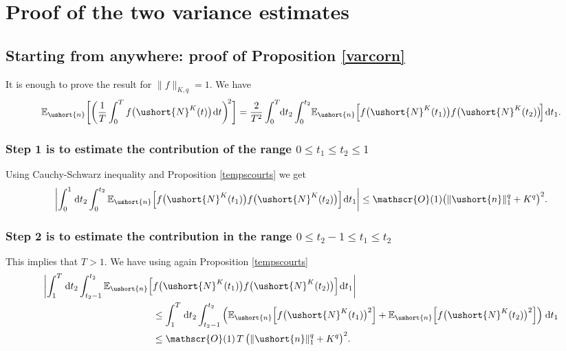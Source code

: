 \documentclass[10pt]{amsart}
\newcommand{\scaleto}[2]{#1}
\let\mathcal\mathscr
\numberwithin{equation}{section}
\theoremstyle{plain}
\theoremstyle{definition}
\newcommand{\E}{{\mathbb{E}}}
\newcommand{\Oun}{\mathcal{O}(1)}
\newcommand{\sK}{K}
\newcommand{\vecn}{\ushort{n}}
\newcommand{\leproc}{\ushort{N}^{K}}
\newcommand{\dd}{\hspace{1pt}\mathrm{d}}
\newcommand{\norm}[1]{\|#1\|_{1}}\let\snorm\norm
\begin{document}
\appendix

\section{Proof of the two variance estimates}\label{proof-variances}

\subsection{Starting from anywhere: proof of Proposition \ref{varcorn}}

It is enough to prove the result for $\|f\|_{\sK,q}=1$.
We have
\[
\E_{\vecn}\biggl[\biggl(\frac{1}{T}
\int_{0}^{T}f\bigl(\leproc(t)\bigr)\dd t\biggr)^{\!2}\biggr]
=\frac{\scaleto{2}{6pt}}{T^2}\int_{0}^{T}\!\!\dd t_{2}\int_{0}^{t_{2}}\!\E_{\vecn}\Bigl[
f\bigl(\leproc(t_{1})\bigr) f\bigl(\leproc(t_{2})\bigr)\!\Bigr]\dd t_{1}.
\]
\subsubsection*{Step 1 is to estimate the contribution of the range $0\le t_{1}\le t_{2}\le 1$} Using Cauchy-Schwarz inequality and Proposition \ref{tempscourts} we get
\[
\left|\int_{0}^{1}\dd t_{2}\int_{0}^{t_{2}}\E_{\vecn}\Bigl[
f\bigl(\leproc(t_{1})\bigr) f\bigl(\leproc(t_{2})\bigr)\Bigr]\dd t_{1}\right|
\le \Oun \bigl(\norm{\vecn}^{q}+K^{q}\bigr)^2.
\]
\subsubsection*{Step 2 is to estimate the contribution in the range $0\le
t_{2}-1\leq t_{1}\leq t_{2}$} This implies that $T>1$.
We have using again Proposition \ref{tempscourts}
\begin{align*}
\biggl|\int_{1}^{T} \dd t_{2}\int_{t_{2}-1}^{t_{2}}\E_{\vecn}
\Bigl[&f\bigl(\leproc(t_{1})\bigr) f\bigl(\leproc(t_{2})\bigr)\Bigr]\dd t_{1}\biggr|\\
& \le \int_{1}^{T} \dd t_{2}\int_{t_{2}-1}^{t_{2}}\left(\E_{\vecn}\Bigl[
f\bigl(\leproc(t_{1})\bigr)^2\Bigr]+ \E_{\vecn}\Bigl[f\bigl(\leproc(t_{2})\bigr)^2\Bigr]\right)\dd t_{1}\\
& \le \Oun \,T\,\bigl(\norm{\vecn}^{q}+K^{q}\bigr)^2.
\end{align*}
\end{document}
